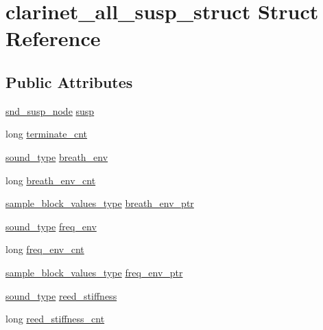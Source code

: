 \hypertarget{structclarinet__all__susp__struct}{}\section{clarinet\+\_\+all\+\_\+susp\+\_\+struct Struct Reference}
\label{structclarinet__all__susp__struct}
\subsection*{Public Attributes}
\begin{DoxyCompactItemize}
\item 
\hyperlink{sound_8h_a6b268203688a934bd798ceb55f85d4c0}{snd\+\_\+susp\+\_\+node} \hyperlink{structclarinet__all__susp__struct_a19306915022f42e71d0c30b49f91cd84}{susp}
\item 
long \hyperlink{structclarinet__all__susp__struct_a2a86eb694162fff564faee4e32dd2b58}{terminate\+\_\+cnt}
\item 
\hyperlink{sound_8h_a792cec4ed9d6d636d342d9365ba265ea}{sound\+\_\+type} \hyperlink{structclarinet__all__susp__struct_a2251679dec431528190f8595369dd2a7}{breath\+\_\+env}
\item 
long \hyperlink{structclarinet__all__susp__struct_abec9d270a850f01f877d8d806f67e086}{breath\+\_\+env\+\_\+cnt}
\item 
\hyperlink{sound_8h_a83d17f7b465d1591f27cd28fc5eb8a03}{sample\+\_\+block\+\_\+values\+\_\+type} \hyperlink{structclarinet__all__susp__struct_ad25a3a25b51c7adaa30ab03182f75f9f}{breath\+\_\+env\+\_\+ptr}
\item 
\hyperlink{sound_8h_a792cec4ed9d6d636d342d9365ba265ea}{sound\+\_\+type} \hyperlink{structclarinet__all__susp__struct_ad9db70d5a60b8409dc249aba845266e5}{freq\+\_\+env}
\item 
long \hyperlink{structclarinet__all__susp__struct_afedb00ffb8cd5e8555422b9150ce8616}{freq\+\_\+env\+\_\+cnt}
\item 
\hyperlink{sound_8h_a83d17f7b465d1591f27cd28fc5eb8a03}{sample\+\_\+block\+\_\+values\+\_\+type} \hyperlink{structclarinet__all__susp__struct_a5245d804010d1d9d3810cb083df6eaac}{freq\+\_\+env\+\_\+ptr}
\item 
\hyperlink{sound_8h_a792cec4ed9d6d636d342d9365ba265ea}{sound\+\_\+type} \hyperlink{structclarinet__all__susp__struct_a54ad7604f2b6c59714669c6bd6060a4e}{reed\+\_\+stiffness}
\item 
long \hyperlink{structclarinet__all__susp__struct_a7f04ea11755dbcc429d24b2d613b11ef}{reed\+\_\+stiffness\+\_\+cnt}

\end{DoxyCompactItemize}
